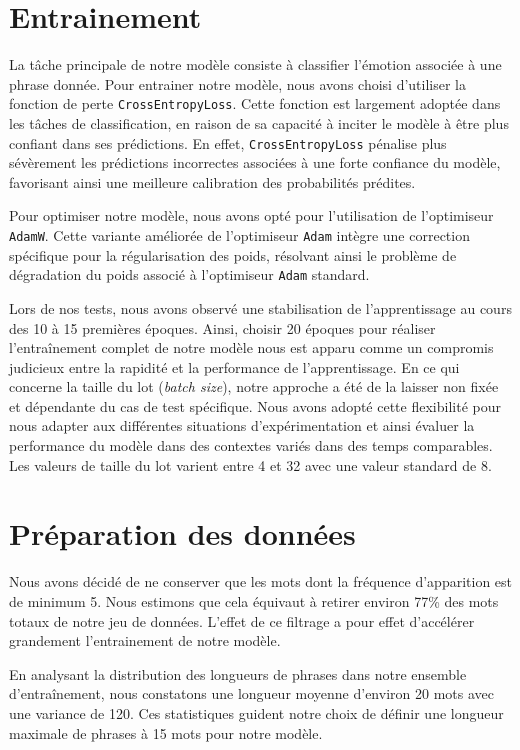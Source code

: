 \documentclass{article}
\begin{document}
\section{Entrainement}
La tâche principale de notre modèle consiste à classifier l'émotion associée à une phrase donnée. 
Pour entrainer notre modèle, nous avons choisi d'utiliser la fonction de perte \texttt{CrossEntropyLoss}. 
Cette fonction est largement adoptée dans les tâches de classification, en raison de sa capacité à inciter le modèle à être plus confiant dans ses prédictions. 
En effet, \texttt{CrossEntropyLoss} pénalise plus sévèrement les prédictions incorrectes associées à une forte confiance du modèle, favorisant ainsi une meilleure calibration des probabilités prédites. 

Pour optimiser notre modèle, nous avons opté pour l'utilisation de l'optimiseur \texttt{AdamW}. 
Cette variante améliorée de l'optimiseur \texttt{Adam} intègre une correction spécifique pour la régularisation des poids, résolvant ainsi le problème de dégradation du poids associé à l'optimiseur \texttt{Adam} standard. 

Lors de nos tests, nous avons observé une stabilisation de l'apprentissage au cours des 10 à 15 premières époques. 
Ainsi, choisir 20 époques pour réaliser l'entraînement complet de notre modèle nous est apparu comme un compromis judicieux entre la rapidité et la performance de l'apprentissage.
En ce qui concerne la taille du lot (\textit{batch size}), notre approche a été de la laisser non fixée et dépendante du cas de test spécifique. 
Nous avons adopté cette flexibilité pour nous adapter aux différentes situations d'expérimentation et ainsi évaluer la performance du modèle dans des contextes variés dans des temps comparables. 
Les valeurs de taille du lot varient entre 4 et 32 avec une valeur standard de 8.

\section{Préparation des données}
Nous avons décidé de ne conserver que les mots dont la fréquence d’apparition est de minimum 5. 
Nous estimons que cela équivaut à retirer environ 77\% des mots totaux de notre jeu de données.
L’effet de ce filtrage a pour effet d’accélérer grandement l’entrainement de notre modèle. 

En analysant la distribution des longueurs de phrases dans notre ensemble d'entraînement, 
nous constatons une longueur moyenne d'environ 20 mots avec une variance de 120. 
Ces statistiques guident notre choix de définir une longueur maximale de phrases à 15 mots pour notre modèle. 
\end{document}
